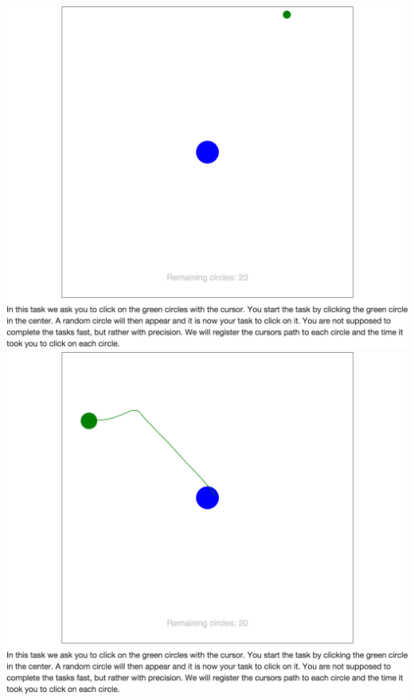 \begin{appendices}
\begin{minipage}{\textwidth}
\centering
\includegraphics[height=.4\textheight]{images/screenshots/ex_step_6_pointing_target_2}
\label{fig:ex_step_6_pointing_target_2}
\includegraphics[height=.4\textheight]{images/screenshots/ex_step_6_pointing_path}
\label{fig:ex_step_6_pointing_path}
\end{minipage}


\end{appendices}
